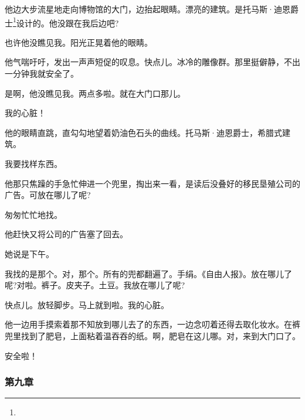 \par 他边大步流星地走向博物馆的大门，边抬起眼睛。漂亮的建筑。是托马斯·迪恩爵士\footnote{}设计的。他没跟在我后边吧?
\par 也许他没瞧见我。阳光正晃着他的眼睛。
\par 他气喘吁吁，发出一声声短促的叹息。快点儿。冰冷的雕像群。那里挺僻静，不出一分钟我就安全了。
\par 是啊，他没瞧见我。两点多啦。就在大门口那儿。
\par 我的心脏！
\par 他的眼睛直跳，直勾勾地望着奶油色石头的曲线。托马斯·迪恩爵士，希腊式建筑。
\par 我要找样东西。
\par 他那只焦躁的手急忙伸进一个兜里，掏出来一看，是读后没叠好的移民垦殖公司的广告。可放在哪儿了呢?
\par 匆匆忙忙地找。
\par 他赶快又将公司的广告塞了回去。
\par 她说是下午。
\par 我找的是那个。对，那个。所有的兜都翻遍了。手绢。《自由人报》。放在哪儿了呢?对啦。裤子。皮夹子。土豆。我放在哪儿了呢?
\par 快点儿。放轻脚步。马上就到啦。我的心脏。
\par 他一边用手摸索着那不知放到哪儿去了的东西，一边念叨着还得去取化妆水。在裤兜里找到了肥皂，上面粘着温吞吞的纸。啊，肥皂在这儿哪。对，来到大门口了。
\par 安全啦！




\subsubsection*{第九章}

